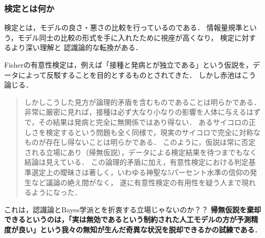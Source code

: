 \documentclass[uplatex,dvipdfmx]{jsreport}
\begin{document}
\subsubsection{検定とは何か}

\begin{tcolorbox}[colframe=ForestGreen, colback=ForestGreen!10!white,breakable,colbacktitle=ForestGreen!40!white,coltitle=black,fonttitle=\bfseries\sffamily,
title=]
    検定とは，モデルの良さ・悪さの比較を行っているのである．
    情報量規準という，モデル同士の比較の形式を手に入れたために視座が高くなり，
    検定に対するより深い理解と
    認識論的な転換がある．
\end{tcolorbox}

\begin{discussion}[最小AIC推定の哲学から見た有意性検定]
    Fisherの有意性検定は，例えば「接種と発病とが独立である」という仮説を，データによって反駁することを目的とするものとされてきた．
    しかし赤池\cite{赤池76}はこう論じる．
    \begin{quote}
        しかしこうした見方が論理的矛盾を含むものであることは明らかである．
        非常に厳密に見れば，接種は必ず大なり小なりの影響を人体に与えるはずで，その結果は発病と完全に無関係ではあり得ない．
        あるサイコロの正しさを検定するという問題も全く同様で，現実のサイコロで完全に対称なものが存在し得ないことは明らかである．
        このように，仮説は常に否定される立場にあり（帰無仮説），データによる検定結果を待つまでもなく結論は見えている．
        この論理的矛盾に加え，有意性検定における判定基準選定上の曖昧さは著しく，いわゆる神聖な5パーセント水準の信仰の発生など議論の絶え間がなく，
        遂に有意性検定の有用性を疑う人まで現れるようになった．
    \end{quote}
    これは，認識論とBayes学派とを折衷する立場じゃないのか？？
    \textbf{帰無仮説を棄却できるというのは，「実は無効であるという制約された人工モデルの方が予測精度が良い」という我々の無知が生んだ奇異な状況を脱却できるかの試練である}．


\end{discussion}
\end{document}
